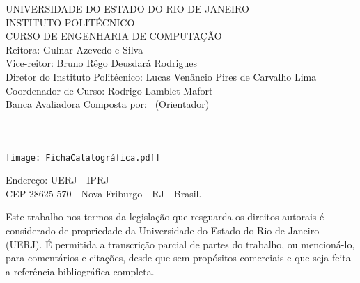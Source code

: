 \newcommand{\imprimircatalogacao}{%
	\noindent
	UNIVERSIDADE DO ESTADO DO RIO DE JANEIRO\\
	INSTITUTO POLITÉCNICO \\ 
    CURSO DE ENGENHARIA DE COMPUTAÇÃO\\
	
    \noindent
	Reitora: Gulnar Azevedo e Silva\\
    Vice-reitor: Bruno Rêgo Deusdará Rodrigues \\
	Diretor do Instituto Politécnico: Lucas Venâncio Pires de Carvalho Lima\\
	Coordenador de Curso: Rodrigo Lamblet Mafort\\
	
	\noindent
	Banca Avaliadora Composta por: \imprimirorientador~(Orientador)\\ 
	\hspace*{6.3cm}\membrobancaA\\
	\hspace*{6.3cm}\membrobancaB\\
    \\
   \texttt{[image: FichaCatalográfica.pdf]}

\pagenumbering{gobble}
\noindent
Endereço: UERJ - IPRJ \\
\hspace*{2cm} CEP 28625-570 - Nova Friburgo - RJ - Brasil.

	\noindent
 Este trabalho nos termos da legislação que resguarda os direitos autorais é considerado de propriedade da Universidade do Estado do Rio de Janeiro (UERJ). É permitida a transcrição parcial de partes do trabalho, ou mencioná-lo, para comentários e citações, desde que sem propósitos comerciais e que seja feita a referência bibliográfica completa.
	\begin{flushright}
		\assinatura{\imprimirautor}
	\end{flushright}
}

\imprimircatalogacao
{}